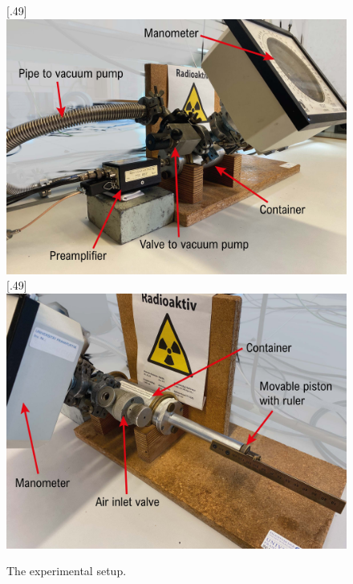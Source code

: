 \begin{figure}
	\centering
	[.49\linewidth]{\includegraphics[width=\linewidth]{img/setup_1.jpg}}
	[.49\linewidth]{\includegraphics[width=\linewidth]{img/setup_2.jpg}}
	\caption{The experimental setup.}
	\label{fig:setup_}
\end{figure}
